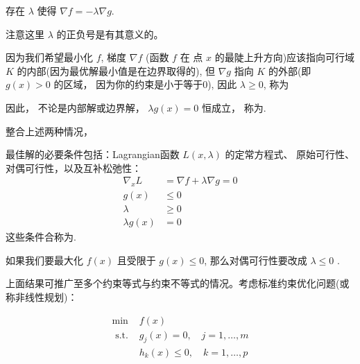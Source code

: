\begin{corollary}
    存在 $\lambda$ 使得 $\nabla f=-\lambda \nabla g$.

    注意这里 $\lambda$ 的正负号是有其意义的。
\end{corollary}

因为我们希望最小化 $f$, 梯度 $\nabla f$ (函数 $f$ 在 点 ${x}$ 的最陡上升方向)应该指向可行域 $K$ 的内部(因为最优解最小值是在边界取得的), 但 $\nabla g$ 指向 $K$ 的外部(即 $g({x})>0$ 的区域， 因为你的约束是小于等于0), 因此 $\lambda \geq 0$, 称为

因此， 不论是内部解或边界解， $\lambda g({x})=0$ 恒成立， 称为.

整合上述两种情况， 

\begin{theorem}
    最佳解的必要条件包括：Lagrangian函数 $L({x}, \lambda)$ 的定常方程式、 原始可行性、对偶可行性，以及互补松弛性：
\begin{equation}
\begin{aligned}
\nabla_{{x}} L &=\nabla f+\lambda \nabla g={0} \\
g({x}) & \leq 0 \\
\lambda & \geq 0 \\
\lambda g({x}) &=0
\end{aligned}
\end{equation}
这些条件合称为.

如果我们要最大化 $f({x})$ 且受限于 $g({x}) \leq 0$, 那么对偶可行性要改成 $\lambda \leq 0$ .
\end{theorem}


上面结果可推广至多个约束等式与约束不等式的情况。考虑标准约束优化问题(或称非线性规划)：

\begin{definition}
    \begin{equation}
\begin{array}{ll}
\min & f({x}) \\
\text { s.t. } & g_{j}({x})=0, \quad j=1, \ldots, m \\
& h_{k}({x}) \leq 0, \quad k=1, \ldots, p
\end{array}
\end{equation}
\end{definition}

